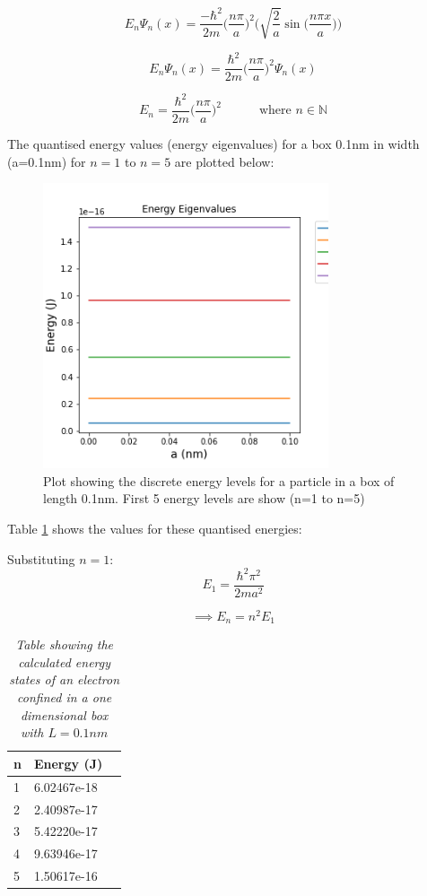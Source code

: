 $$E_n \Psi_n (x) = \frac{-\hbar ^{2}}{2m}\Big(\frac{n\pi}{a}\Big)^{2}\Bigg(\sqrt{\frac{2}{a}}\sin\Big(\frac{n\pi x}{a}\Big)\Bigg)$$

$$E_n \Psi_n (x) = \frac{\hbar ^{2}}{2m}\Big(\frac{n\pi}{a}\Big)^{2}\Psi_n (x)$$

$$E_n = \frac{\hbar ^{2}}{2m}\Big(\frac{n\pi}{a}\Big)^{2} \quad \quad \quad \text{where } n \in \mathbb{N}$$

The quantised energy values (energy eigenvalues) for a box 0.1nm in width (a=0.1nm) for $n=1$ to $n=5$ are plotted below:

\begin{figure}[h]
    \centering
    \includegraphics[width=0.75\textwidth]{lab1/eigenvaluesEnergy.png}
    \caption{Plot showing the discrete energy levels for a particle in a box of length 0.1nm. First 5 energy levels are show (n=1 to n=5)}
    \label{fig:eigenEnergy}
\end{figure}

Table \ref{tab:qEnerergy} shows the values for these quantised energies:

Substituting $n=1$:
$$E_1 = \frac{\hbar ^{2}\pi^{2}}{2ma^{2}}$$

\begin{equation}\label{eq:energySpacing}
\implies E_n =  n^{2}E_1
\end{equation}




\begin{table}[h!]
\centering
\begin{tabular}{|l|l|l|}
\hline
\textbf{n} & \textbf{Energy (J)} \\ \hline
1 & 6.02467e-18 \\ \hline
2 & 2.40987e-17 \\ \hline
3 & 5.42220e-17 \\ \hline
4 & 9.63946e-17 \\ \hline
5 & 1.50617e-16 \\ \hline
\end{tabular}
\caption{\textit{Table showing the calculated energy states of an electron confined in a one dimensional box with $L=0.1nm$}}
\label{tab:qEnerergy}
\end{table}

